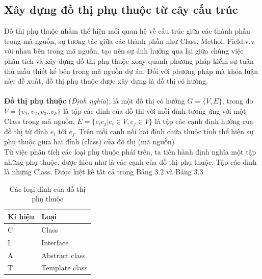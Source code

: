 \documentclass[12pt]{report}
\begin{document}
\subsection{Xây dựng đồ thị phụ thuộc từ cây cấu trúc}
Đồ thị phụ thuộc nhằm thể hiện mối quan hệ về cấu trúc giữa các thành phần trong mã nguồn, sự tương tác giữa các thành phần như Class, Methol, Field.v.v với nhau bên trong mã nguồn, tạo nên sự ảnh hưởng qua lại giữa chúng
việc phân tích và xây dựng đồ thị phụ thuộc xoay quanh phương pháp kiểm sự tuân thủ mẫu thiết kế bên trong mã nguồn dự án.
Đối với phương pháp mà khóa luận này đề xuất, đồ thị phụ thuộc được xây dựng là đồ thị có hướng.\\\\
\noindent \textbf{Đồ thị phụ thuộc} (\textit{Định nghĩa}): là một đồ thị có hướng $G = \{V,E \}$, trong đo $V = \{v_1,v_2,v_3..v_k\}$ là tập các đỉnh của đồ thị với mỗi đỉnh tương ứng với một Class trong mã nguồn, $E = \{ e_ie_j | e_i \in V, e_j \in V  \}$ là tập các cạnh đinh hướng của đồ thị từ đỉnh $e_i$ tới $e_j$. Trên mỗi cạnh nối hai đỉnh chứa thuộc tính thể hiện sự phụ thuộc giữa hai đỉnh (class) của đồ thị (mã nguồn)\\

\noindent Từ việc phân tích các loại phụ thuộc phái trên, ta tiến hành định nghĩa một tập những phụ thuộc, được hiẻu như là các cạnh của đồ thị phụ thuộc. Tập các đỉnh là những Class. Được kiệt kê tất cả trong Bảng 3.2 \cite{orucc2016} và Bảng 3.3 \cite{orucc2016}

\begin{table}[!htbp]
	\centering
	\caption{Các loại đỉnh của đồ thị phụ thuộc}
	\label{tbl:java-class-type}
	\begin{tabular}{|p{3cm}|p{9cm}|}
		\hline
		\textbf{Kí hiệu} & \textbf{Loại} \\ \hline
		C				& Class\\ \hline
		I				& Interface \\ \hline
		A				& Abstract class \\ \hline
		T				& Template class \\ \hline         
	\end{tabular}
\end{table}
\end{document}
